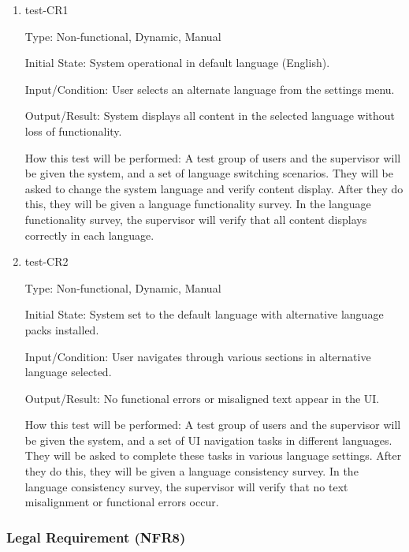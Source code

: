 \documentclass[12pt, titlepage]{article}
\begin{document}
\begin{enumerate}
    \item{test-CR1} \label{test-CR1}
    
    Type: Non-functional, Dynamic, Manual
    
    Initial State: System operational in default language (English).
    
    Input/Condition: User selects an alternate language from the settings menu.
    
    Output/Result: System displays all content in the selected language without loss of functionality.
    
    How this test will be performed: A test group of users and the supervisor will be given the system, and a set of language switching scenarios. They will be asked to change the system language and verify content display. After they do this, they will be given a language functionality survey. In the language functionality survey, the supervisor will verify that all content displays correctly in each language.

    \item{test-CR2} \label{test-CR2}
    
    Type: Non-functional, Dynamic, Manual
    
    Initial State: System set to the default language with alternative language packs installed.

    Input/Condition: User navigates through various sections in alternative language selected.
    
    Output/Result: No functional errors or misaligned text appear in the UI.
    
    How this test will be performed: A test group of users and the supervisor will be given the system, and a set of UI navigation tasks in different languages. They will be asked to complete these tasks in various language settings. After they do this, they will be given a language consistency survey. In the language consistency survey, the supervisor will verify that no text misalignment or functional errors occur.

\end{enumerate}

\subsubsection{Legal Requirement (NFR8)} \label{section:4.2.8}
\end{document}
